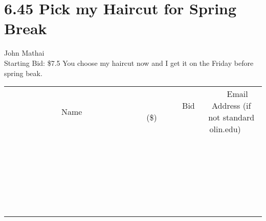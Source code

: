 \documentclass[11pt]{article}
\begin{document}
\section*{6.45 Pick my Haircut for Spring Break}
John Mathai
\\
Starting Bid: \$7.5
\newline
You choose my haircut now and I get it on the Friday before spring beak.
\\[6ex]
\begin{tabular}{c c c}
~~~~~~~~~~~~~Name~~~~~~~~~~~~~ & ~~~~~~~~~Bid (\$)~~~~~~~~~  & ~~~Email Address (if not standard olin.edu)~~~\\
 & & \\
\hline
 & & \\
\hline
 & & \\
\hline
 & & \\
\hline
 & & \\
\hline
 & & \\
\hline
 & & \\
\hline
 & & \\
\hline
 & & \\
\hline
 & & \\
\hline
 & & \\
\hline
 & & \\
\hline
 & & \\
\hline
 & & \\
\hline
 & & \\
\hline
 & & \\
\hline
 & & \\
\hline
 & & \\
\hline
 & & \\
\hline
 & & \\
\hline
 & & \\
\hline
 & & \\
\hline
 & & \\
\hline
 & & \\
\hline
 & & \\
\hline
 & & \\
\hline
\end{tabular}
\newpage
\end{document}

